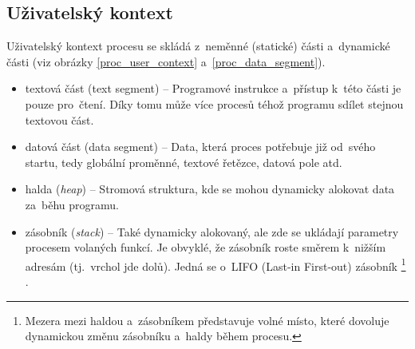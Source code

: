 \subsection{Uživatelský kontext}

Uživatelský kontext procesu se skládá z~neměnné (statické) části a~dynamické části (viz obrázky \ref{proc_user_context} a~\ref{proc_data_segment}).

\begin{itemize}
	\item textová část (text segment) -- Programové instrukce a~přístup k~této části je pouze pro~čtení. Díky tomu může více procesů téhož programu sdílet stejnou textovou část.
	\item datová část (data segment) -- Data, která proces potřebuje již od~svého startu, tedy globální proměnné, textové řetězce, datová pole atd.
	\item halda (\emph{heap}) -- Stromová struktura, kde se mohou dynamicky alokovat data za~běhu programu.
	\item zásobník (\emph{stack}) -- Také dynamicky alokovaný, ale zde se ukládají parametry procesem volaných funkcí. Je obvyklé, že zásobník roste směrem k~nižším adresám (tj.~vrchol jde dolů). Jedná se o~LIFO (Last-in First-out) zásobník%
	\footnote{Mezera mezi haldou a~zásobníkem představuje volné místo, které dovoluje dynamickou změnu zásobníku a~haldy během procesu.}%
	.
\end{itemize}

